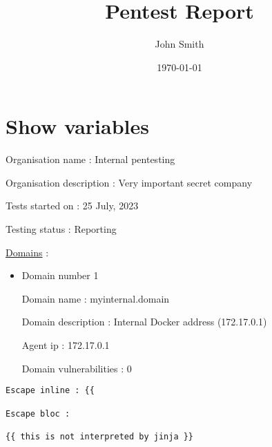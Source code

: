 \documentclass[a4paper,11pt]{book}
\title{Pentest Report} %
\author{John Smith} %
\date{\today} %
\begin{document}
 
\maketitle %

\section{Show variables}

Organisation name : Internal pentesting

Organisation description : Very important secret company

Tests started on : 25 July, 2023\

Testing status : Reporting

\underline{Domains} :

\begin{itemize}
    \item Domain number 1

    Domain name : myinternal.domain

    Domain description : Internal Docker address (172.17.0.1)
    
        Agent ip : 172.17.0.1

    Domain vulnerabilities : 0
    



\end{itemize}


\begin{verbatim} 
Escape inline : {{

Escape bloc : 
 
{{ this is not interpreted by jinja }}

\end{verbatim}
\end{document}
